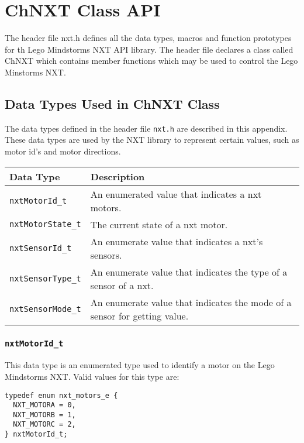 \section{\label{sec:chnxt_api}ChNXT Class API}
The header file nxt.h defines all the data types, macros and function prototypes 
for th Lego Mindstorms NXT API library. The header file declares a class called 
ChNXT which contains member functions which may be used to control the Lego
Minstorms NXT.\\
\subsection{\label{sec:datatypes}Data Types Used in ChNXT Class}
The data types defined in the header file {\tt nxt.h} are described in this 
appendix. These data types are used by the NXT library to represent certain values, 
such as motor id's and motor directions.\\

\noindent
\begin{longtable}{p{3.5cm}p{12cm}} 
    \hline
    Data Type& Description \\
    \hline 
    {\tt nxtMotorId\_t} & An enumerated value that indicates a 
    nxt motors. \\
    {\tt nxtMotorState\_t} & The current state of a nxt motor. \\
    {\tt nxtSensorId\_t} & An enumerate value that indicates a 
    nxt's sensors. \\
    {\tt nxtSensorType\_t} & An enumerate value that indicates 
    the type of a sensor of a nxt.\\
    {\tt nxtSensorMode\_t} & An enumerate value that indicates 
    the mode of a sensor for getting value. \\
    \hline
\end{longtable}

\subsubsection{\label{sec:nxtMotorId_t}{\tt nxtMotorId\_t}}
This data type is an enumerated type used to identify a motor on 
the Lego Mindstorms NXT. Valid values for this type are:
\begin{lstlisting}
typedef enum nxt_motors_e {
  NXT_MOTORA = 0,
  NXT_MOTORB = 1,
  NXT_MOTORC = 2,
} nxtMotorId_t;
\end{lstlisting}

